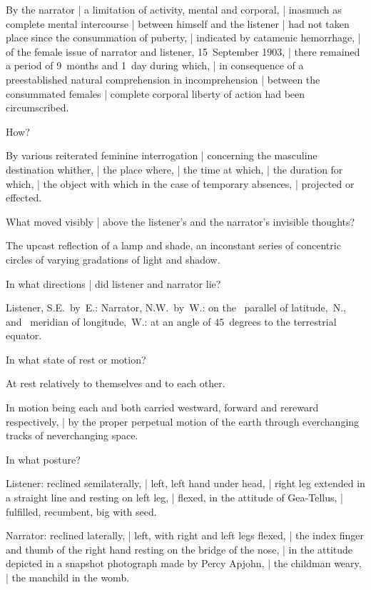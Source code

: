 \Bloom
By the narrator |
a limitation of activity, mental and corporal, |
inasmuch as complete mental intercourse |
between himself and the listener |
had not taken place since the consummation of puberty, |
indicated by catamenic hemorrhage, |
of the female issue of narrator and listener,
15~September 1903, |
there remained a period of 9~months and 1~day during which, |
in consequence of a preestablished natural comprehension in incomprehension |
between the consummated females
 |
complete corporal liberty of action had been circumscribed.


How?

\Factual[~(legal)]
By various reiterated feminine interrogation |
concerning the masculine destination whither, |
the place where, |
the time at which, |
the duration for which, |
the object with which in the case of temporary absences, |
projected or effected.


What moved visibly |
above the listener's and the narrator's invisible thoughts?

\Household
The upcast reflection of a lamp and shade,
an inconstant series of concentric circles
of varying gradations of light and shadow.


In what directions |
did listener and narrator lie?

\Science
Listener, S.E.~by~E.:
Narrator, N.W.~by~W.:
on the ~parallel of latitude,~N.,
and ~meridian of longitude,~W.:
at an angle of 45~degrees to the terrestrial equator.



In what state of rest or motion?

\Science
At rest relatively to themselves and to each other.

\Poetry
In motion being each and both
carried westward, forward and rereward respectively, |
by the proper perpetual motion of the earth
through everchanging tracks of neverchanging space.%


In what posture?

\Molly
Listener:
reclined semilaterally, |
left, left hand under head, |
right leg extended in a straight line and resting on left leg, |
flexed, in the attitude of Gea-Tellus, |
fulfilled, recumbent,
big with seed.

\Bloom
Narrator:
reclined laterally, |
left, with right and left legs flexed, |
the index finger and thumb of the right hand resting on the bridge of the nose, |
in the attitude depicted in a snapshot photograph made by Percy Apjohn, |
the childman weary, |
the manchild in the womb.


